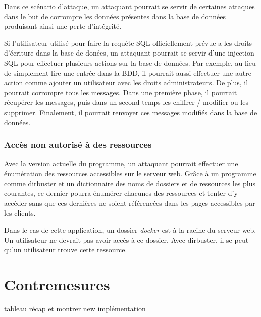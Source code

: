 \documentclass[12pt]{article}
\begin{document}
Dans ce scénario d'attaque, un attaquant pourrait se servir de certaines attaques dans le but de corrompre les données présentes dans la base de données produisant ainsi une perte d'intégrité.

Si l'utilisateur utilisé pour faire la requête SQL officiellement prévue a les droits d'écriture dans la base de donées, un attaquant pourrait se servir d'une injection SQL pour effectuer plusieurs actions sur la base de données. Par exemple, au lieu de simplement lire une entrée dans la BDD, il pourrait aussi effectuer une autre action comme ajouter un utilisateur avec les droits administrateurs. De plus, il pourrait corrompre tous les messages. Dans une première phase, il pourrait récupérer les messages, puis dans un second temps les chiffrer / modifier ou les supprimer. Finalement, il pourrait renvoyer ces messages modifiés dans la base de données.

\subsubsection{Accès non autorisé à des ressources} \label{5}

Avec la version actuelle du programme, un attaquant pourrait effectuer une énumération des ressources accessibles sur le serveur web. Grâce à un programme comme dirbuster et un dictionnaire des noms de dossiers et de ressources les plus courantes, ce dernier pourra énumérer chacunes des ressources et tenter d'y accèder sans que ces dernières ne soient référencées dans les pages accessibles par les clients.

Dans le cas de cette application, un dossier \textit{docker} est à la racine du serveur web. Un utilisateur ne devrait pas avoir accès à ce dossier. Avec dirbuster, il se peut qu'un utilisateur trouve cette ressource.

\newpage
\section{Contremesures}

tableau récap et montrer new implémentation
\end{document}
